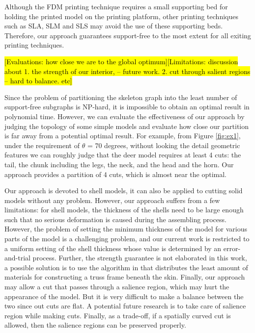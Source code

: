 Although the FDM printing technique requires a small supporting bed for holding the printed model on the printing platform, other printing techniques such as SLA, SLM and SLS may avoid the use of these supporting beds. Therefore, our approach guarantees support-free to the most extent for all exiting printing techniques.

\hl {[Evaluations: how close we are to the global optimum][Limitations: discussion about 1. the strength of our interior, -- future work. 2. cut through salient regions -- hard to balance. etc]}

Since the problem of partitioning the skeleton graph into the least number of support-free subgraphs is NP-hard, it is impossible to obtain an optimal result in polynomial time. However, we can evaluate the effectiveness of our approach by judging the topology of some simple models and evaluate how close our partition is far away from a potential optimal result. For example, from Figure \ref{fig:ex1}, under the requirement of $\theta$ = 70 degrees, without looking the detail geometric features we can roughly judge that the deer model requires at least 4 cuts: the tail, the chunk including the legs, the neck, and the head and the horn. Our approach provides a partition of 4 cuts, which is almost near the optimal.



Our approach is devoted to shell models, it can also be applied to cutting solid models without any problem. However, our approach suffers from a few limitations: for shell models, the thickness of the shells need to be large enough such that no serious deformation is caused during the assembling process. However, the problem of setting the minimum thickness of the model for various parts of the model is a challenging problem, and our current work is restricted to a uniform setting of the shell thickness whose value is determined by an error-and-trial process. Further, the strength guarantee is not elaborated in this work, a possible solution is to use the algorithm in \cite{WangWYLTTDCL13} that distributes the least amount of materials for constructing a truss frame beneath the skin. Finally, our approach may allow a cut that passes through a salience region, which may hurt the appearance of the model. But it is very difficult to make a balance between the two since out cuts are flat. A potential future research is to take care of salience region while making cuts. Finally, as a trade-off, if a spatially curved cut is allowed, then the salience regions can be preserved properly.
